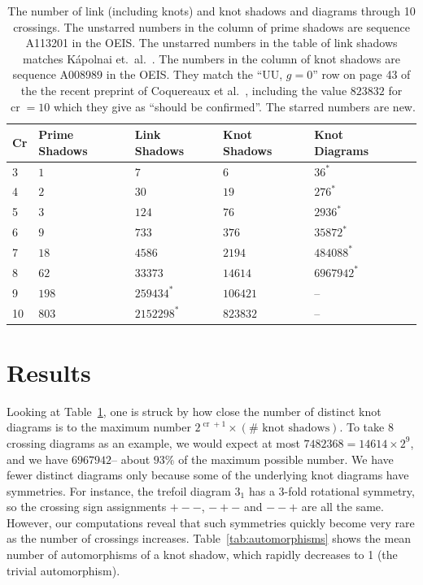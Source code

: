 \documentclass[amsmath,secnumarabic,floatfix,amssymb,nofootinbib,nobibnotes,letterpaper,11pt,tightenlines,showkeys]{revtex4}
\theoremstyle{definition}
\newcommand{\Cr}{\operatorname{cr}}
\newcommand{\tref}{3_1}
\let\mgp=\marginpar \marginparwidth18mm \marginparsep1mm
\def\marginpar#1{\mgp{\raggedright\tiny #1}}
\let\lbl=\label
\def\label#1{\lbl{#1}\ifinner\else\marginpar{\ref{#1} #1}\ignorespaces\fi}
\begin{document}
\begin{table}
\begin{ruledtabular}
\begin{tabular}{llllll} 
Cr & Prime Shadows & Link Shadows    & Knot Shadows     & Knot Diagrams \\ \hline
3  & $\num{1}$   & $\num{7}$         & $\num{6}$        & $\num{36}^*$ \\
4  & $\num{2}$   & $\num{30}$        & $\num{19}$       & $\num{276}^*$ \\
5  & $\num{3}$   & $\num{124}$       & $\num{76}$       & $\num{2936}^*$ \\
6  & $\num{9}$   & $\num{733}$       & $\num{376}$      & $\num{35872}^*$ \\
7  & $\num{18}$  & $\num{4586}$      & $\num{2194}$     & $\num{484088}^*$ \\
8  & $\num{62}$  & $\num{33373}$     & $\num{14614}$    & $\num{6967942}^*$ \\
9  & $\num{198}$ & $\num{259434}^*$  & $\num{106421}$   & -- \\
10 & $\num{803}$ & $\num{2152298}^*$ & $\num{823832}$   & -- \\ 
\end{tabular}
\end{ruledtabular}
\caption{The number of link (including knots) and knot shadows and diagrams through 10 crossings. The unstarred numbers in the column of prime shadows are sequence A113201 in the OEIS. The unstarred numbers in the table of link shadows matches K\'apolnai et.\ al.~\cite{Kapolnai:2012hs}. The numbers in the column of knot shadows are sequence A008989 in the OEIS. They match the ``UU, $g=0$'' row on page 43 of the the recent preprint of Coquereaux et al.~\cite{Coquereaux:2015wv}, including the value $\num{823832}$ for $\Cr=10$ which they give as ``should be confirmed''. The starred numbers are new.}
\label{tab:counts}
\end{table}

\section{Results}

Looking at Table~\ref{tab:counts}, one is struck by how close the number of distinct knot diagrams is to the maximum number $2^{\Cr+1} \times (\# \text{ knot shadows})$. To take 8 crossing diagrams as an example, we would expect at most $\num{7482368} =\num{14614} \times 2^9$, and we have $\num{6967942}$-- about $93\%$ of the maximum possible number. We have fewer distinct diagrams only because some of the underlying knot diagrams have symmetries. For instance, the trefoil diagram $\tref$ has a 3-fold rotational symmetry, so the crossing sign assignments $+--$, $-+-$ and $--+$ are all the same. However, our computations reveal that such symmetries quickly become very rare as the number of crossings increases. Table~\ref{tab:automorphisms} shows the mean number of automorphisms of a knot shadow, which rapidly decreases to 1 (the trivial automorphism).
\end{document}
